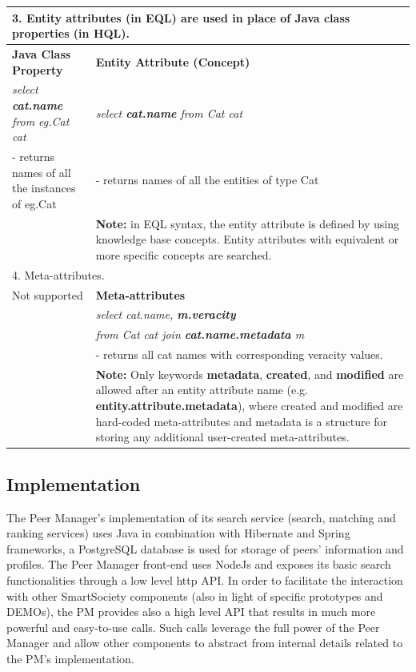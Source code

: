 \begin{table}[ht]
\begin{tabularx}{\linewidth}{|X|X|}
\multicolumn{2}{|p{0.9\linewidth}|}{3. Entity attributes (in EQL) are used in place of Java class properties (in HQL).} \\
\hline
\textbf{Java Class Property} & \textbf{Entity Attribute (Concept)} \\
\hdashline
\emph{select \textbf{cat.name} from eg.Cat cat} & \emph{select \textbf{cat.name} from Cat cat} \\
- returns names of all the instances of eg.Cat & - returns names of all the entities of type Cat \\
 & \textbf{Note:} in EQL syntax, the entity attribute is defined by using knowledge base concepts. Entity attributes with equivalent or more specific concepts are searched. \\
\hline

\multicolumn{2}{|p{0.9\linewidth}|}{4. Meta-attributes.} \\
\hline
Not supported & \textbf{Meta-attributes} \\
\hdashline
 & \emph{select cat.name, \textbf{m.veracity}} \\
 & \emph{from Cat cat join \textbf{cat.name.metadata} m} \\
 & - returns all cat names with corresponding veracity values. \\
 & \textbf{Note:} Only keywords \textbf{metadata}, \textbf{created}, and \textbf{modified} are allowed after an entity attribute name (e.g. \textbf{entity.attribute.metadata}), where created and modified are hard-coded meta-attributes and metadata is a structure for storing any additional user-created meta-attributes. \\
\hline
\end{tabularx}
\label{tab:hql_vs_eql}
\end{table}%



\subsection{Implementation}

The Peer Manager's implementation of its search service (search, matching and ranking services) uses Java in combination with Hibernate and Spring frameworks, a PostgreSQL database is used for storage of peers' information and profiles. The Peer Manager front-end uses NodeJs and exposes its basic search functionalities through a low level http API. In order to facilitate the interaction with other SmartSociety components (also in light of specific prototypes and DEMOs), the PM provides also a high level API that results in much more powerful and easy-to-use calls. Such calls leverage the full power of the Peer Manager and allow other components to abstract from internal details related to the PM's implementation. 

